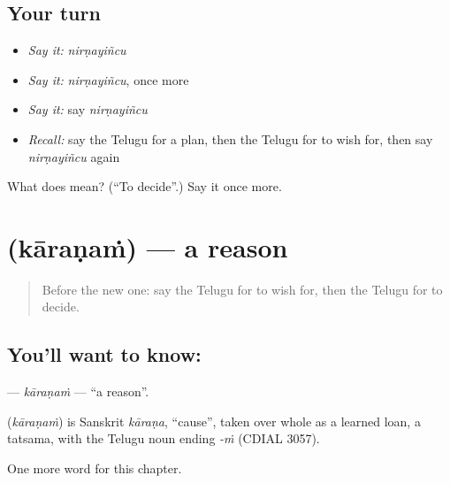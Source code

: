 \subsection*{Your turn}
\begin{itemize}
\raggedright
  \item \emph{Say it:} \emph{nirṇayiñcu}
  \item \emph{Say it:} \emph{nirṇayiñcu}, once more
  \item \emph{Say it:} say \emph{nirṇayiñcu}
  \item \emph{Recall:} say the Telugu for a plan, then the Telugu for to wish for, then say \emph{nirṇayiñcu} again
\end{itemize}

\begin{tcolorbox}[breakable,colback=teal!4,colframe=teal!35!black,title={Before you move on}]
What does  mean? (\textquotedblleft{}To decide\textquotedblright{}.) Say it once more.
\end{tcolorbox}
\section[\texorpdfstring{\te{కారణం} (kāraṇaṁ)}{కారణం (kāraṇaṁ)}]{ (kāraṇaṁ) — a reason}

\label{lesson:TE-C108-karanam}



\begin{quote}
Before the new one: say the Telugu for to wish for, then the Telugu for to decide.
\end{quote}

\subsection*{You'll want to know: }
\textbf{} — \emph{kāraṇaṁ} — \textquotedblleft{}a reason\textquotedblright{}.

\begin{cousinweb}
\textbf{} (\emph{kāraṇaṁ}) is Sanskrit \emph{kāraṇa}, \textquotedblleft{}cause\textquotedblright{}, taken over whole as a learned loan, a tatsama, with the Telugu noun ending \emph{-ṁ} (CDIAL 3057).
\end{cousinweb}

\begin{grammarlens}[title={What you've built}]
One more word for this chapter.
\end{grammarlens}

